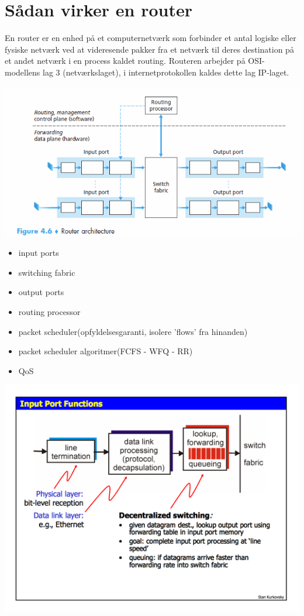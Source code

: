 {{{\section{Sådan virker en router}
En router er en enhed på et computernetværk som forbinder et antal logiske eller fysiske netværk ved at videresende pakker fra et netværk til deres destination på et andet netværk i en process kaldet routing. Routeren arbejder på OSI-modellens lag 3 (netværkslaget), i internetprotokollen kaldes dette lag IP-laget.
\begin{center}
  \includegraphics[scale=0.8]{4-network-layer/whats-inside-a-router.png}
\end{center}
\begin{itemize}
	\item input ports
	\item switching fabric
	\item output ports
	\item routing processor
	\item packet scheduler(opfyldelsesgaranti, isolere 'flows' fra hinanden)
	\item packet scheduler algoritmer(FCFS - WFQ - RR)
	\item QoS
\end{itemize}
{\includegraphics{4-network-layer/router-input-port}
}}}}
